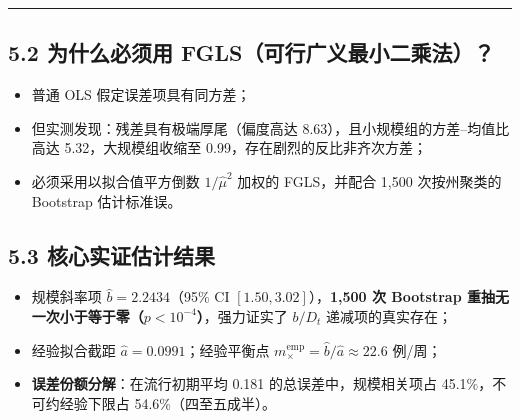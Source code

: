 \documentclass[11pt,a4paper]{ctexart}
\begin{document}
\vspace{0.8em}\hrule\vspace{0.8em}

\subsection{5.2 为什么必须用 FGLS（可行广义最小二乘法）？}
\begin{itemize}[leftmargin=2em, itemsep=2pt, parsep=0pt]
\item 普通 OLS 假定误差项具有同方差；
\item 但实测发现：残差具有极端厚尾（偏度高达 8.63），且小规模组的方差--均值比高达 5.32，大规模组收缩至 0.99，存在剧烈的反比非齐次方差；
\item 必须采用以拟合值平方倒数 $1/\hat{\mu}^2$ 加权的 FGLS，并配合 1,500 次按州聚类的 Bootstrap 估计标准误。
\end{itemize}

\subsection{5.3 核心实证估计结果}
\begin{itemize}[leftmargin=2em, itemsep=2pt, parsep=0pt]
\item 规模斜率项 $\hat{b} = 2.2434$（95\% CI $[1.50, 3.02]$），\textbf{1,500 次 Bootstrap 重抽无一次小于等于零（$p < 10^{-4}$）}，强力证实了 $b/D_t$ 递减项的真实存在；
\item 经验拟合截距 $\hat{a} = 0.0991$；经验平衡点 $m_\times^{\mathrm{emp}} = \hat{b}/\hat{a} \approx 22.6$ 例/周；
\item \textbf{误差份额分解}：在流行初期平均 0.181 的总误差中，规模相关项占 45.1\%，不可约经验下限占 54.6\%（四至五成半）。
\end{itemize}
\end{document}
